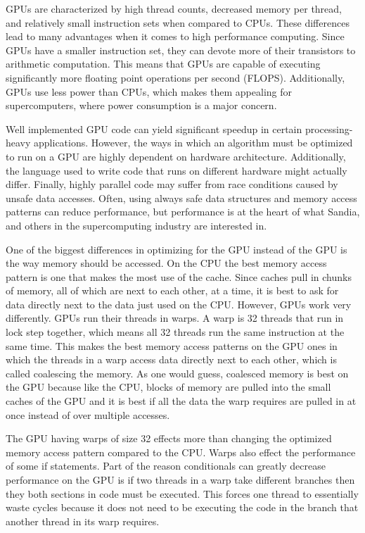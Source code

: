 GPUs are characterized by high thread counts, decreased memory per thread, and
relatively small instruction sets when compared to CPUs. These differences lead
to many advantages when it comes to high performance computing. Since GPUs have
a smaller instruction set, they can devote more of their transistors to
arithmetic computation. This means that GPUs are capable of executing
significantly more floating point operations per second (FLOPS). Additionally,
GPUs use less power than CPUs, which makes them appealing for supercomputers,
where power consumption is a major concern.

Well implemented GPU code can yield significant speedup in certain
processing-heavy applications.  However, the ways in which an algorithm must be
optimized to run on a GPU are highly dependent on hardware architecture. Additionally, the language
used to write code that runs on different hardware might actually differ.  Finally, 
highly parallel code may suffer from race conditions caused by unsafe data accesses.
Often, using always safe data structures and memory access patterns can reduce performance, 
but performance is at the heart of what Sandia, and others in the supercomputing industry
are %
interested in.

One of the biggest differences in optimizing for the GPU instead of the GPU is the way memory should be accessed. On the CPU the best memory access pattern is one that makes the most use of the cache. Since caches pull in chunks of memory, all of which are next to each other, at a time, it is best to ask for data directly next to the data just used on the CPU. However, GPUs work very differently. GPUs run their threads in warps. A warp is 32 threads that run in lock step together, which means all 32 threads run the same instruction at the same time. This makes the best memory access patterns on the GPU ones in which the threads in a warp access data directly next to each other, which is called coalescing the memory. As one would guess, coalesced memory is best on the GPU because like the CPU, blocks of memory are pulled into the small caches of the GPU and it is best if all the data the warp requires are pulled in at once instead of over multiple accesses.

The GPU having warps of size 32 effects more than changing the optimized memory access pattern compared to the CPU. Warps also effect the performance of some if statements. Part of the reason conditionals can greatly decrease performance on the GPU is if two threads in a warp take different branches then they both sections in code must be executed. This forces one thread to essentially waste cycles because it does not need to be executing the code in the branch that another thread in its warp requires. 

